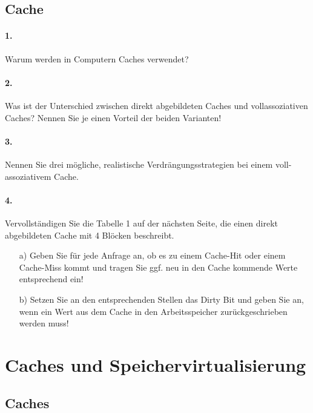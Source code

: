 \documentclass[paper=a4, fontsize=11pt]{scrartcl}
\numberwithin{equation}{section}
\numberwithin{figure}{section}
\numberwithin{table}{section}
\begin{document}
\subsection{Cache}

\paragraph{1.}
Warum werden in Computern Caches verwendet?

\paragraph{2.}
Was ist der Unterschied zwischen direkt abgebildeten Caches und vollassoziativen Caches? Nennen Sie je einen Vorteil der beiden Varianten!

\paragraph{3.}
Nennen Sie drei mögliche, realistische Verdrängungsstrategien bei einem voll-assoziativem Cache.

\paragraph{4.}
Vervollständigen Sie die Tabelle 1 auf der nächsten Seite, die einen direkt abgebildeten Cache mit 4 Blöcken beschreibt.

\begin{itemize}
\item[a)] Geben Sie für jede Anfrage an, ob es zu einem Cache-Hit oder einem Cache-Miss kommt und tragen Sie ggf. neu in den Cache kommende Werte entsprechend ein!
\item[b)] Setzen Sie an den entsprechenden Stellen das Dirty Bit und geben Sie an, wenn ein Wert aus dem Cache in den Arbeitsspeicher zurückgeschrieben werden muss!
\end{itemize}

\section{Caches und Speichervirtualisierung}
\subsection{Caches}
\end{document}
